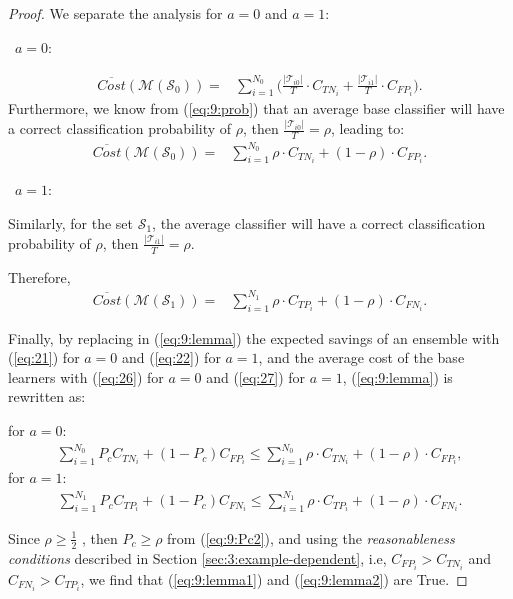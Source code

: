 {\begin{proof}
  \noindent We separate the analysis for $a=0$ and $a=1$:
  
  \textbullet\ $a=0:$
  
  \begin{align}
    \overline{Cost} (\mathcal{M}(\mathcal{S}_0)) =& \sum_{i=1}^{N_0} \bigg( 
    \frac{\vert \mathcal{T}_{i0} \vert}{T} \cdot C_{TN_i}
    + \frac{\vert \mathcal{T}_{i1} \vert}{T} \cdot C_{FP_i}\bigg).
  \end{align}
  Furthermore, we know from (\ref{eq:9:prob}) that an average base classifier will have a correct 
  classification probability of $\rho$, then $\frac{\vert \mathcal{T}_{i0} \vert}{T}=\rho$, leading 
  to:
  \begin{align}\label{eq:26}
    \overline{Cost} (\mathcal{M}(\mathcal{S}_0)) =& \sum_{i=1}^{N_0}  
    \rho \cdot C_{TN_i} + (1-\rho) \cdot C_{FP_i} .
  \end{align}

  \textbullet\ $a=1:$
 
 \noindent Similarly, for the set $\mathcal{S}_1$, the average classifier will have a correct 
  classification probability of $\rho$, then $\frac{\vert \mathcal{T}_{i1} \vert}{T}=\rho$. 
  
  \noindent Therefore,
  \begin{align}\label{eq:27}
    \overline{Cost} (\mathcal{M}(\mathcal{S}_1)) =& \sum_{i=1}^{N_1}  
    \rho \cdot C_{TP_i} + (1-\rho) \cdot C_{FN_i} .
  \end{align}
 
	\noindent Finally, by replacing in (\ref{eq:9:lemma}) the expected savings of an  ensemble with 
  (\ref{eq:21}) for $a=0$ and (\ref{eq:22}) for $a=1$, and the average cost of the base learners 
  with  (\ref{eq:26}) for $a=0$ and (\ref{eq:27}) for $a=1$, (\ref{eq:9:lemma}) is rewritten as:
  
  \noindent for $a=0$:
  \begin{align}\label{eq:9:lemma1}
    \sum_{i=1}^{N_0} P_c C_{TN_i} +(1-P_c)C_{FP_i} \le 
    \sum_{i=1}^{N_0} \rho \cdot C_{TN_i} + (1-\rho) \cdot C_{FP_i},
  \end{align}
  for $a=1$:
  \begin{align}\label{eq:9:lemma2}
    \sum_{i=1}^{N_1} P_c C_{TP_i} + (1-P_c)C_{FN_i} \le 
    \sum_{i=1}^{N_1}  \rho \cdot C_{TP_i} + (1-\rho) \cdot C_{FN_i}.
  \end{align}
 
  \noindent Since $\rho \ge \frac{1}{2}$ , then $P_c\ge\rho$ from (\ref{eq:9:Pc2}), and using the 
  \textit{reasonableness conditions} described in Section \ref{sec:3:example-dependent}, i.e, 
  $C_{FP_i} > C_{TN_i}$ and   $C_{FN_i} > C_{TP_i}$, we find that (\ref{eq:9:lemma1}) and 
  (\ref{eq:9:lemma2}) are  True.
  \end{proof}
  
}
